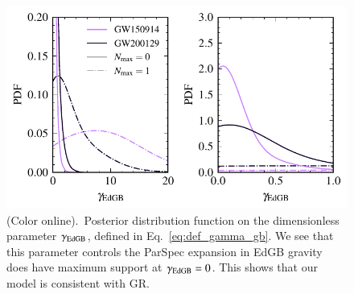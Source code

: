 \documentclass[twocolumn,
               prd,
               aps,
               superscriptaddress,
               tightenlines,
               nofootinbib,
               eqsecnum,
               amsfonts,
               amsmath,
               longbibliography]{revtex4-1}
\begin{document}
\begin{figure}[h]
\includegraphics[width=\columnwidth]{figs/edgb_gamma.pdf}
\caption{(Color online).~Posterior distribution function on the dimensionless parameter $\gamma_{\rm EdGB}$,
defined in Eq.~\eqref{eq:def_gamma_gb}. We see that this parameter controls the ParSpec expansion in EdGB gravity
does have maximum support at $\gamma_{\rm EdGB} = 0$. This shows that our model is consistent with GR.}
\label{fig:gamma_gb}
\end{figure}
\end{document}
